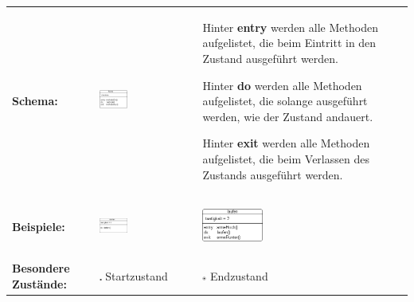\bgroup
\def\arraystretch{1.2}
\begin{tabular}{lp{55mm}p{62mm}}
\textbf{Schema:} &
\vspace{-6mm}
\begin{center}
\includegraphics[width=0.3\textwidth]{./inf/SEKII/11_UML_Zustandsdiagramme/schemaZustand.png}
\end{center}
&
Hinter \textbf{entry} werden alle Methoden aufgelistet, die
beim Eintritt in den Zustand ausgeführt werden. 

Hinter \textbf{do} werden alle Methoden aufgelistet, die solange
ausgeführt werden, wie der Zustand andauert. 

Hinter \textbf{exit} werden alle Methoden aufgelistet, die beim
Verlassen des Zustands ausgeführt werden.
\\
\textbf{Beispiele:} &
\vspace{-6mm}
\begin{center}
\includegraphics[width=0.3\textwidth]{./inf/SEKII/11_UML_Zustandsdiagramme/beispielStehen.png}
\end{center}
&
\vspace{-6mm}
\begin{center}
\includegraphics[width=0.3\textwidth]{./inf/SEKII/11_UML_Zustandsdiagramme/beispielLaufen.png}
\end{center}
\\
\textbf{Besondere Zustände:} &
\vspace{-3mm}
\includegraphics[width=0.02\textwidth]{./inf/SEKII/11_UML_Zustandsdiagramme/startzustand.png}
\hspace{2mm} Startzustand
&
\vspace{-3mm}
\includegraphics[width=0.02\textwidth]{./inf/SEKII/11_UML_Zustandsdiagramme/endzustand.png}
\hspace{2mm} Endzustand
\\
\end{tabular}
\egroup


